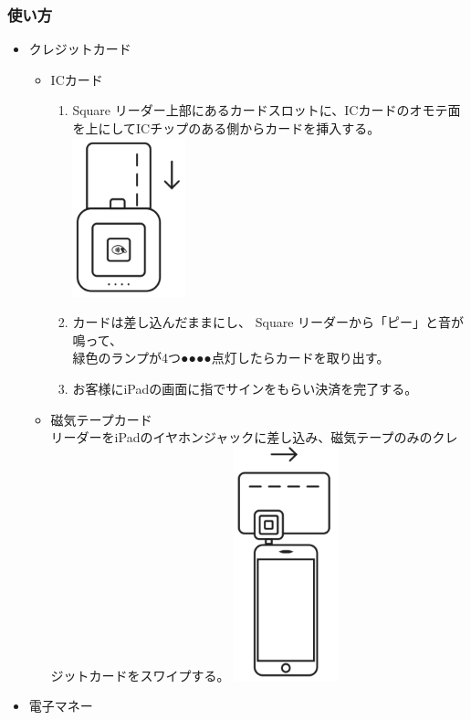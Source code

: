 \documentclass[dvipdfmx,jb5]{jarticle}
\begin{document}
 \subsubsection{使い方}
 \begin{itemize}
  \item クレジットカード
  \begin{itemize}
  \item ICカード
  \begin{enumerate}[手順1]
   \item Square リーダー上部にあるカードスロットに、ICカードのオモテ面を上にしてICチップのある側からカードを挿入する。\\
   \includegraphics[scale=0.4]{assets/square_insert-card.png}
   \item カードは差し込んだままにし、 Square リーダーから「ピー」と音が鳴って、\\緑色のランプが4つ{\color{green}●●●●}点灯したらカードを取り出す。
   \item お客様にiPadの画面に指でサインをもらい決済を完了する。
  \end{enumerate}
  \item 磁気テープカード\\
  リーダーをiPadのイヤホンジャックに差し込み、磁気テープのみのクレジットカードをスワイプする。
  \includegraphics[scale=0.4]{assets/square_slide-card.png}
  \end{itemize}
  \item 電子マネー\\

\end{itemize}
\end{document}
